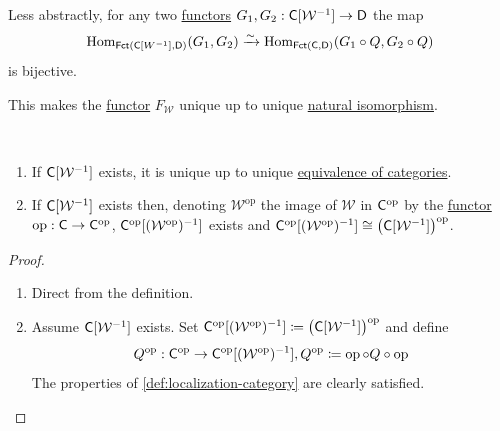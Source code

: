 \documentclass[../../main]{subfiles}
\begin{document}
\begin{definition}
\begin{enumerate}
          Less abstractly, for any two \hyperref[def:functor]{functors} \(G_{1}, G_{2}: \mathsf{C}[\mathcal{W}^{-1}] \to \mathsf{D}\) the map
          \begin{equation*}
            \operatorname{Hom}_{\mathsf{Fct}(\mathsf{C}[W^{-1}], \mathsf{D})}(G_{1}, G_{2}) \xrightarrow{\sim} \operatorname{Hom}_{\mathsf{Fct}(\mathsf{C}, \mathsf{D})}(G_{1} \circ Q, G_{2} \circ Q)
          \end{equation*}
          is bijective.

          This makes the \hyperref[def:functor]{functor} \(F_{\mathcal{W}}\) unique up to unique \hyperref[def:natural-transformation]{natural isomorphism}.
  \end{enumerate}
\end{definition}

\begin{proposition}~
  \begin{enumerate}
    \item If \(\mathsf{C}[\mathcal{W}^{-1}]\) exists, it is unique up to unique \hyperref[def:equivalent-categories]{equivalence of categories}.
    \item If \(\mathsf{C}[\mathcal{W}^{-1}]\) exists then, denoting \(\mathcal{W}^{\operatorname{op}}\) the image of \(\mathcal{W}\) in \(\mathsf{C}^{\operatorname*{op}}\) by the \hyperref[def:functor]{functor} \(\operatorname{op}: \mathsf{C} \to \mathsf{C}^{\operatorname*{op}}\), \(\mathsf{C}^{\operatorname*{op}}[(\mathcal{W}^{\operatorname{op}})^{-1}]\) exists and \(\mathsf{C}^{\operatorname*{op}}[(\mathcal{W}^{\operatorname{op}})^{-1}] \cong \left( \mathsf{C}[\mathcal{W}^{-1}] \right)^{\operatorname{op}}\).
  \end{enumerate}
\end{proposition}
\begin{proof}~
\begin{enumerate}
  \item Direct from the definition.
  \item Assume \(\mathsf{C}[\mathcal{W}^{-1}]\) exists.
        Set \(\mathsf{C}^{\operatorname*{op}}[(\mathcal{W}^{\operatorname{op}})^{-1}] \coloneq \left( \mathsf{C}[\mathcal{W}^{-1}] \right)^{\operatorname{op}}\) and define
        \begin{equation*}
          Q^{\operatorname{op}}: \mathsf{C}^{\operatorname*{op}} \to \mathsf{C}^{\operatorname*{op}}[(\mathcal{W}^{\operatorname{op}})^{-1}], Q^{\operatorname{op}} \coloneq  \operatorname{op} \circ Q \circ \operatorname{op}
        \end{equation*}
        The properties of \autoref{def:localization-category} are clearly satisfied.
\end{enumerate}
\end{proof}
\end{document}
